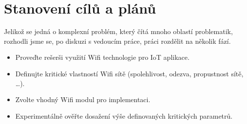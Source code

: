 \section{Stanovení cílů a plánů}

Jelikož se jedná o komplexní problém, který čítá mnoho oblastí problematik, rozhodli jsme se, po diskuzi s vedoucím práce, práci rozdělit na několik fází.


\begin{itemize}
   \item Proveďte rešerši využití Wifi technologie pro IoT aplikace.
   \item Definujte kritické vlastností Wifi sítě (spolehlivost, odezva, propustnost sítě, …).
   \item Zvolte vhodný Wifi modul pro implementaci.
   \item Experimentálně ověřte dosažení výše definovaných kritických parametrů.
\end{itemize}